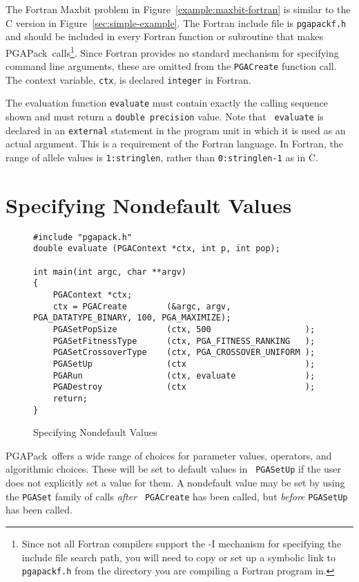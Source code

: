\documentclass{report}
\newcommand{\pga}{PGAPack}
\begin{document}
The Fortran Maxbit problem in Figure~\ref{example:maxbit-fortran} is similar
to the C version in Figure~\ref{sec:simple-example}.  The Fortran include file
is {\tt pgapackf.h} and should be included in every Fortran function or
subroutine that makes \pga\ calls\footnote{Since not all Fortran compilers
support the -I mechanism for specifying the include file search path,
you will need to copy or set up a symbolic link to {\tt pgapackf.h} from
the directory you are compiling a Fortran program in.}.  Since Fortran
provides no standard mechanism for specifying command line arguments, these
are omitted from the {\tt PGACreate} function call.  The context variable,
{\tt ctx}, is declared {\tt integer} in Fortran.

The evaluation function {\tt evaluate} must contain exactly the calling
sequence shown and must return a {\tt double precision} value.  Note that {\tt
evaluate} is declared in an {\tt external} statement in the program unit in
which it is used as an actual argument.  This is a requirement of the Fortran
language.  In Fortran, the range of allele values is {\tt 1:stringlen}, rather
than {\tt 0:stringlen-1} as in C.

\section{Specifying Nondefault Values}\label{sec:default-values}

\begin{figure}
\begin{verbatim}
#include "pgapack.h"
double evaluate (PGAContext *ctx, int p, int pop);

int main(int argc, char **argv)
{
    PGAContext *ctx; 
    ctx = PGACreate        (&argc, argv, PGA_DATATYPE_BINARY, 100, PGA_MAXIMIZE);
    PGASetPopSize          (ctx, 500                   );
    PGASetFitnessType      (ctx, PGA_FITNESS_RANKING   );
    PGASetCrossoverType    (ctx, PGA_CROSSOVER_UNIFORM );
    PGASetUp               (ctx                        );
    PGARun                 (ctx, evaluate              );
    PGADestroy             (ctx                        );
    return;
}
\end{verbatim}
\caption{Specifying Nondefault Values}
\label{example:soph-main}
\end{figure}

\pga\ offers a wide range of choices for parameter values, operators,
and algorithmic choices.  These will be set to default values in {\tt
PGASetUp} if the user does not explicitly set a value for them.  A nondefault
value may be set by using the {\tt PGASet} family of calls {\em after} {\tt
PGACreate} has been called, but {\em before} {\tt PGASetUp} has been called.
\end{document}
